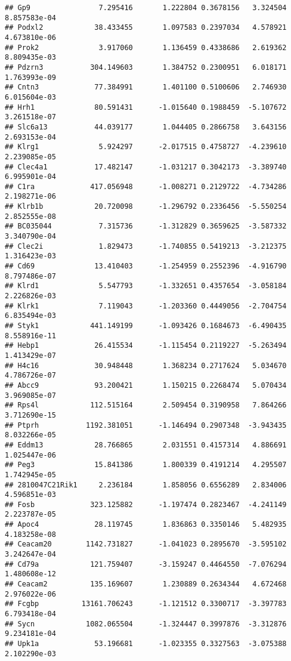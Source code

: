 \documentclass[
]{article}
\begin{document}
\begin{verbatim}
## Gp9                7.295416       1.222804 0.3678156   3.324504 8.857583e-04
## Podxl2            38.433455       1.097583 0.2397034   4.578921 4.673810e-06
## Prok2              3.917060       1.136459 0.4338686   2.619362 8.809435e-03
## Pdzrn3           304.149603       1.384752 0.2300951   6.018171 1.763993e-09
## Cntn3             77.384991       1.401100 0.5100606   2.746930 6.015604e-03
## Hrh1              80.591431      -1.015640 0.1988459  -5.107672 3.261518e-07
## Slc6a13           44.039177       1.044405 0.2866758   3.643156 2.693153e-04
## Klrg1              5.924297      -2.017515 0.4758727  -4.239610 2.239085e-05
## Clec4a1           17.482147      -1.031217 0.3042173  -3.389740 6.995901e-04
## C1ra             417.056948      -1.008271 0.2129722  -4.734286 2.198271e-06
## Klrb1b            20.720098      -1.296792 0.2336456  -5.550254 2.852555e-08
## BC035044           7.315736      -1.312829 0.3659625  -3.587332 3.340790e-04
## Clec2i             1.829473      -1.740855 0.5419213  -3.212375 1.316423e-03
## Cd69              13.410403      -1.254959 0.2552396  -4.916790 8.797486e-07
## Klrd1              5.547793      -1.332651 0.4357654  -3.058184 2.226826e-03
## Klrk1              7.119043      -1.203360 0.4449056  -2.704754 6.835494e-03
## Styk1            441.149199      -1.093426 0.1684673  -6.490435 8.558916e-11
## Hebp1             26.415534      -1.115454 0.2119227  -5.263494 1.413429e-07
## H4c16             30.948448       1.368234 0.2717624   5.034670 4.786726e-07
## Abcc9             93.200421       1.150215 0.2268474   5.070434 3.969085e-07
## Rps4l            112.515164       2.509454 0.3190958   7.864266 3.712690e-15
## Ptprh           1192.381051      -1.146494 0.2907348  -3.943435 8.032266e-05
## Eddm13            28.766865       2.031551 0.4157314   4.886691 1.025447e-06
## Peg3              15.841386       1.800339 0.4191214   4.295507 1.742945e-05
## 2810047C21Rik1     2.236184       1.858056 0.6556289   2.834006 4.596851e-03
## Fosb             323.125882      -1.197474 0.2823467  -4.241149 2.223787e-05
## Apoc4             28.119745       1.836863 0.3350146   5.482935 4.183258e-08
## Ceacam20        1142.731827      -1.041023 0.2895670  -3.595102 3.242647e-04
## Cd79a            121.759407      -3.159247 0.4464550  -7.076294 1.480608e-12
## Ceacam2          135.169607       1.230889 0.2634344   4.672468 2.976022e-06
## Fcgbp          13161.706243      -1.121512 0.3300717  -3.397783 6.793418e-04
## Sycn            1082.065504      -1.324447 0.3997876  -3.312876 9.234181e-04
## Upk1a             53.196681      -1.023355 0.3327563  -3.075388 2.102290e-03

\end{verbatim}
\end{document}
